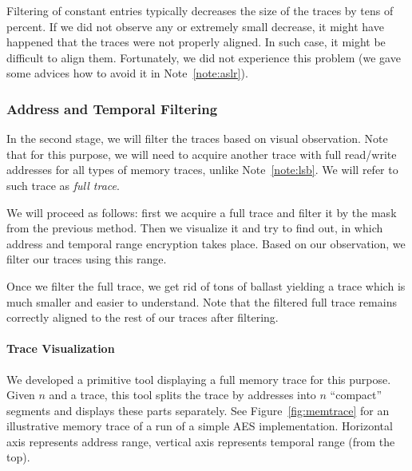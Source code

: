 	\begin{note}
	\label{note:filter}
		Filtering of constant entries typically decreases the size of the traces by tens of percent. If we did not observe any or extremely small decrease, it might have happened that the traces were not properly aligned. In such case, it might be difficult to align them. Fortunately, we did not experience this problem (we gave some advices how to avoid it in Note~\ref{note:aslr}).
	\end{note}

\subsubsection{Address and Temporal Filtering}
\label{subsec:atf}
	
	In the second stage, we will filter the traces based on visual observation. Note that for this purpose, we will need to acquire another trace with full read/write addresses for all types of memory traces, unlike Note~\ref{note:lsb}. We will refer to such trace as {\em full trace}.
	
	We will proceed as follows: first we acquire a full trace and filter it by the mask from the previous method. Then we visualize it and try to find out, in which address and temporal range encryption takes place. Based on our observation, we filter our traces using this range.
	
	\begin{note}
	\label{note:fullfilter}
		Once we filter the full trace, we get rid of tons of ballast yielding a trace which is much smaller and easier to understand. Note that the filtered full trace remains correctly aligned to the rest of our traces after filtering.
	\end{note}
	
	\paragraph{Trace Visualization}
		
		We developed a primitive tool displaying a full memory trace for this purpose. Given $n$ and a trace, this tool splits the trace by addresses into $n$ ``compact'' segments and displays these parts separately. See Figure~\ref{fig:memtrace} for an illustrative memory trace of a run of a simple AES implementation. Horizontal axis represents address range, vertical axis represents temporal range (from the top).
		
